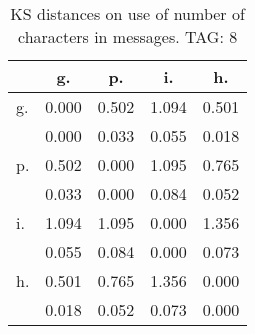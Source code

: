 \begin{table}[h!]
\begin{center}
\begin{tabular}{| l | c | c | c | c |}\hline
 & g. & p. & i. & h. \\\hline
g. & 0.000  & 0.502  & 1.094  & 0.501 \\\hline
 & 0.000  & 0.033  & 0.055  & 0.018 \\\hline
p. & 0.502  & 0.000  & 1.095  & 0.765 \\\hline
 & 0.033  & 0.000  & 0.084  & 0.052 \\\hline
i. & 1.094  & 1.095  & 0.000  & 1.356 \\\hline
 & 0.055  & 0.084  & 0.000  & 0.073 \\\hline
h. & 0.501  & 0.765  & 1.356  & 0.000 \\\hline
 & 0.018  & 0.052  & 0.073  & 0.000 \\\hline
\end{tabular}
\caption{KS distances on use of number of characters in messages. TAG: 8}
\end{center}
\end{table}